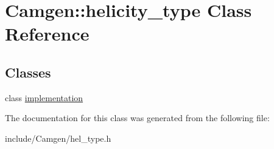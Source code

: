 \hypertarget{a00282}{}\section{Camgen\+:\+:helicity\+\_\+type Class Reference}
\label{a00282}
\subsection*{Classes}
\begin{DoxyCompactItemize}
\item 
class \hyperlink{a00286}{implementation}
\end{DoxyCompactItemize}


The documentation for this class was generated from the following file\+:\begin{DoxyCompactItemize}
\item 
include/\+Camgen/hel\+\_\+type.\+h\end{DoxyCompactItemize}
